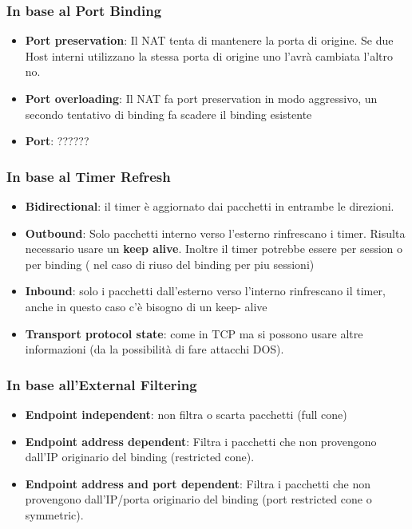 \documentclass[12pt]{article}
\begin{document}
			\subsubsection{In base al Port Binding}
				\begin{itemize}
					\item \textbf{Port preservation}: Il NAT tenta di mantenere la porta di origine. Se due Host interni utilizzano la stessa porta di origine uno l'avrà cambiata l'altro no.
					\item \textbf{Port overloading}: Il NAT fa port preservation in modo aggressivo, un secondo tentativo di binding fa scadere il binding esistente
					\item \textbf{Port}: ??????
				\end{itemize}
			\subsubsection{In base al Timer Refresh}
				\begin{itemize}
					\item \textbf{Bidirectional}: il timer è aggiornato dai pacchetti in entrambe le direzioni.
					\item \textbf{Outbound}: Solo pacchetti interno verso l'esterno rinfrescano i timer. Risulta necessario usare un \textbf{keep alive}. Inoltre il timer potrebbe essere per session o per binding ( nel caso di riuso del binding per piu sessioni)
					\item \textbf{Inbound}: solo i pacchetti dall'esterno verso l'interno rinfrescano il timer, anche in questo caso c'è bisogno di un keep- alive
					\item \textbf{Transport protocol state}: come in TCP ma si possono usare altre informazioni (da la possibilità di fare attacchi DOS).
				\end{itemize}
			\subsubsection{In base all'External Filtering }
				\begin{itemize}
					\item \textbf{Endpoint independent}: non filtra o scarta pacchetti (full cone)
					\item \textbf{Endpoint address dependent}: Filtra i pacchetti che non provengono dall'IP originario del binding (restricted cone).
					\item \textbf{Endpoint address and port dependent}:  Filtra i pacchetti che non provengono dall'IP/porta originario del binding (port restricted cone o symmetric).
				\end{itemize}
\end{document}
